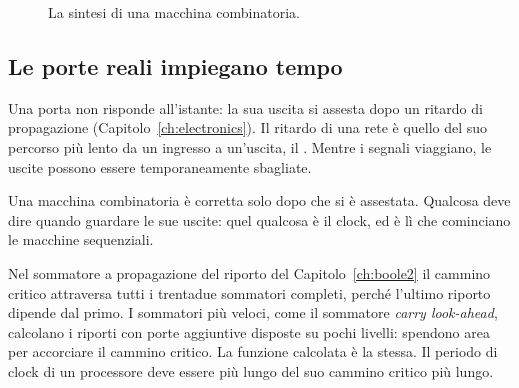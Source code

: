 \begin{figure}[htb]
\centering
{}
\caption{La sintesi di una macchina combinatoria.}
\label{fig:cm:design}
\end{figure}

\subsection{Le porte reali impiegano tempo}

Una porta non risponde all'istante: la sua uscita si assesta dopo un ritardo di
propagazione (Capitolo~\ref{ch:electronics}). Il ritardo di una rete è quello
del suo percorso più lento da un ingresso a un'uscita, il . Mentre i segnali viaggiano, le uscite possono essere temporaneamente
sbagliate.

\begin{prgconcept}
Una macchina combinatoria è corretta solo dopo che si è assestata. Qualcosa
deve dire quando guardare le sue uscite: quel qualcosa è il clock, ed è lì che
cominciano le macchine sequenziali.
\end{prgconcept}

Nel sommatore a propagazione del riporto del Capitolo~\ref{ch:boole2} il
cammino critico attraversa tutti i trentadue sommatori completi, perché
l'ultimo riporto dipende dal primo. I sommatori più veloci, come il sommatore
\emph{carry look-ahead}, calcolano i riporti con porte aggiuntive disposte su
pochi livelli: spendono area per accorciare il cammino critico. La funzione
calcolata è la stessa. Il periodo di clock di un processore deve essere più
lungo del suo cammino critico più lungo.

